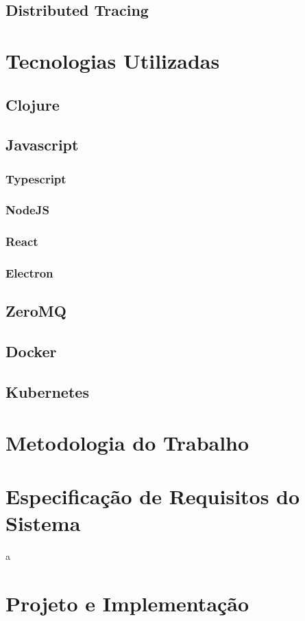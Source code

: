 \documentclass[]{politex}
\begin{document}
	
	\section{Distributed Tracing}
	
 
\chapter{Tecnologias Utilizadas}
	\section{Clojure}
	\section{Javascript}
	\subsection{Typescript}
	\subsection{NodeJS}
	\subsection{React}
	\subsection{Electron}
	\section{ZeroMQ}
	\section{Docker}
	\section{Kubernetes}
	

\chapter{Metodologia do Trabalho}

\chapter{Especificação de Requisitos do Sistema}
	a
	
\chapter{Projeto e Implementação}
\end{document}
